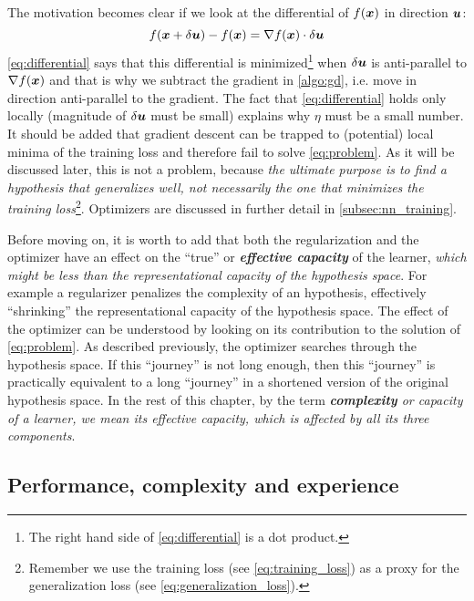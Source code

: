 The motivation becomes clear if we look at the differential of $f(\boldsymbol{x})$ in
direction $\boldsymbol{u}$: \begin{equation} \label{eq:differential} f(\boldsymbol{x} + \delta
\boldsymbol{u}) - f(\boldsymbol{x}) = \nabla f(\boldsymbol{x}) \cdot \delta \boldsymbol{u} \end{equation} \Equation{}
\ref{eq:differential} says that this differential is minimized\footnote{The
right hand side of \Equation{} \ref{eq:differential} is a dot product.} when
$\delta \boldsymbol{u}$ is anti-parallel to $\nabla f(\boldsymbol{x})$ and that is why we subtract
the gradient in \Algorithm{} \ref{algo:gd}, i.e. move in direction anti-parallel to
the gradient. The fact that \Equation{} \ref{eq:differential} holds only locally
(magnitude of $\delta \boldsymbol{u}$ must be small) explains why $\eta$ must be a small
number. It should be added that gradient descent can be trapped to (potential)
local minima of the training loss and therefore fail to solve \Equation{}
\ref{eq:problem}. As it will be discussed later, this is not a problem, because
\emph{the ultimate purpose is to find a hypothesis that generalizes well, not
necessarily the one that minimizes the training loss}\footnote{Remember we use
the training loss (see \Equation{} \ref{eq:training_loss}) as a proxy for the
generalization loss (see \Equation{} \ref{eq:generalization_loss}).}. Optimizers
are discussed in further detail in \Section{} \ref{subsec:nn_training}.

Before moving on, it is worth to add that both the regularization and the
optimizer have an effect on the ``true'' or \emph{\textbf{effective
capacity}} \parencite{deeplearning} of the learner,
\emph{which might be less than the representational
capacity of the hypothesis space}. For example
a regularizer penalizes the complexity of an hypothesis, effectively
``shrinking'' the representational capacity of the hypothesis space. The effect
of the optimizer can be understood by looking on its contribution to the
solution of \Equation{} \ref{eq:problem}. As described previously, the optimizer
searches through the hypothesis space. If this ``journey'' is not long enough,
then this ``journey'' is practically equivalent to a long ``journey'' in a
shortened version of the original hypothesis space. In the rest of this chapter,
by the term \emph{\textbf{complexity} or
capacity of a learner, we mean its effective capacity, which is
affected by all its three components}.

\subsection{Performance, complexity and experience}


